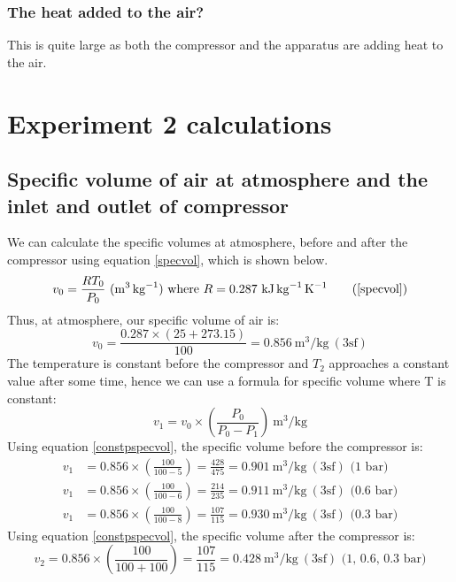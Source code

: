 \documentclass[class=article, crop=false, 12pt,a4paper]{standalone}
\numberwithin{equation}{section}
\begin{document}
\subsubsection{The heat added to the air?}
This is quite large as both the compressor and the apparatus are adding heat to the air.
\section{Experiment 2 calculations}
\subsection{Specific volume of air at atmosphere and the inlet and outlet of compressor}
We can calculate the specific volumes at atmosphere, before and after the compressor using equation \ref{specvol}, which is shown below.
\begin{equation}
  v_0 = \frac{RT_0}{P_0} \ (\si{\meter\cubed\per\kg}) \textrm{ where \(R = 0.287 \ \si{\kilo\joule\per\kg\per\kelvin}\)}
  \tag{\ref{specvol}}
\end{equation}
Thus, at atmosphere, our specific volume of air is:
\begin{equation} 
  v_0 = \frac{0.287 \times (25+273.15)}{100} = 0.856 \ \si{\meter\cubed\per\kg} \ (3\textrm{sf}) 
\end{equation}
The temperature is constant before the compressor and \(T_2\) approaches a constant value after some time, hence we can use a formula for specific volume where T is constant:
\begin{equation}
  v_1 = v_0 \times \left( \frac{P_0}{P_0 - P_1} \right) \ \si{\meter\cubed\per\kg}
  \label{constpspecvol}
\end{equation}
Using equation \ref{constpspecvol}, the specific volume before the compressor is:
\begin{align} 
  v_1 &= 0.856 \times \left( \frac{100}{100-5} \right) = \frac{428}{475} = 0.901 \ \si{\meter\cubed\per\kg} \ (3\textrm{sf}) \textrm{ (1 bar)} \\
  v_1 &= 0.856 \times \left( \frac{100}{100-6} \right) = \frac{214}{235} = 0.911 \ \si{\meter\cubed\per\kg} \ (3\textrm{sf}) \textrm{ (0.6 bar)} \\
  v_1 &= 0.856 \times \left( \frac{100}{100-8} \right) = \frac{107}{115} = 0.930 \ \si{\meter\cubed\per\kg} \ (3\textrm{sf}) \textrm{ (0.3 bar)} 
\end{align}
Using equation \ref{constpspecvol}, the specific volume after the compressor is:
\begin{equation} v_2 = 0.856 \times \left( \frac{100}{100+100} \right) = \frac{107}{115} = 0.428 \ \si{\meter\cubed\per\kg} \ (3\textrm{sf}) \textrm{ (1, 0.6, 0.3 bar)} \end{equation}
\end{document}
